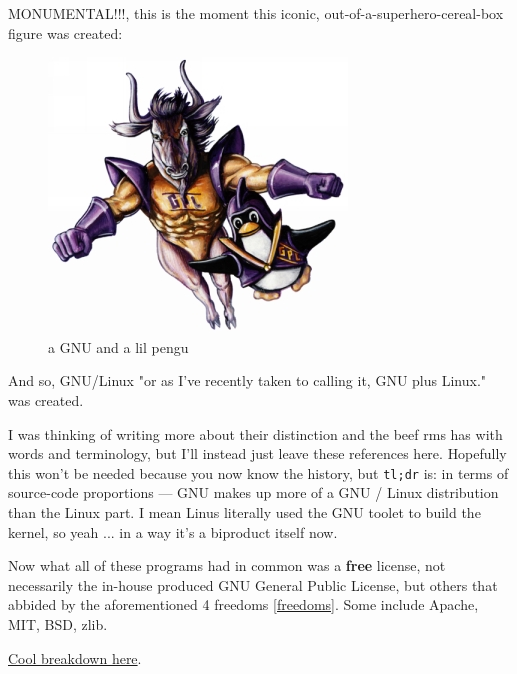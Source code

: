\documentclass[sigplan,screen]{acmart}
\begin{document}
MONUMENTAL!!!, this is the moment this iconic, out-of-a-superhero-cereal-box figure was created:
\begin{figure}[H]
	\centering
	\includegraphics[width=\columnwidth]{pics/gnu-and-penguin.jpg}
	\caption{a GNU and a lil pengu}
	\label{fig:gnu-linux}
\end{figure}
And so, GNU/Linux "or as I've recently taken to calling it, GNU plus Linux." \cite{gnu-and-linux} was created.

I was thinking of writing more about their distinction and the beef rms has with words and terminology, but I'll instead just leave these references here. \cite{gnu-vs-linux-1} \cite{gnu-vs-linux-2} \cite{gnu-vs-linux-3} Hopefully this won't be needed because you now know the history, but \verb|tl;dr| is: in terms of source-code proportions — GNU makes up more of a GNU / Linux distribution than the Linux part. I mean Linus literally used the GNU toolet to build the kernel, so yeah ... in a way it's a biproduct itself now.

Now what all of these programs had in common was a \textbf{free} license, not necessarily the in-house produced GNU General Public License, but others that abbided by the aforementioned 4 freedoms \ref{freedoms}. Some include Apache, MIT, BSD, zlib.

\href{https://www.gnu.org/philosophy/categories.html}{Cool breakdown here}. \cite{free-categories}
\end{document}
